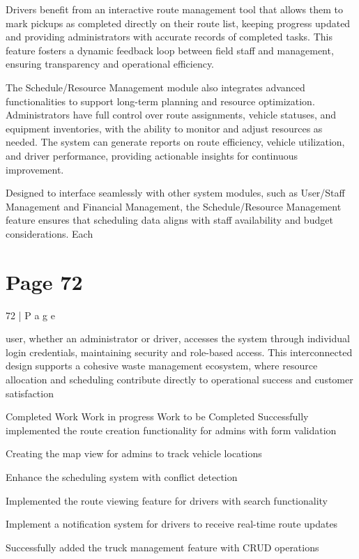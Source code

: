 \documentclass{article}
\begin{document}
Drivers benefit from an interactive route management tool that allows them to mark 
pickups as completed directly on their route list, keeping progress updated and providing 
administrators with accurate records of completed tasks. This feature fosters a dynamic 
feedback loop between field staff and management, ensuring transparency and 
operational efficiency. 
  
The Schedule/Resource Management module also integrates advanced functionalities to 
support long-term planning and resource optimization. Administrators have full control 
over route assignments, vehicle statuses, and equipment inventories, with the ability to 
monitor and adjust resources as needed. The system can generate reports on route 
efficiency, vehicle utilization, and driver performance, providing actionable insights for 
continuous improvement. 
  
Designed to interface seamlessly with other system modules, such as User/Staff 
Management and Financial Management, the Schedule/Resource Management feature 
ensures that scheduling data aligns with staff availability and budget considerations. Each 

\section*{Page 72}
72 | P a g e 
 
user, whether an administrator or driver, accesses the system through individual login 
credentials, maintaining security and role-based access. This interconnected design 
supports a cohesive waste management ecosystem, where resource allocation and 
scheduling contribute directly to operational success and customer satisfaction 
 
 
Completed Work Work in progress Work to be Completed 
Successfully implemented 
the route creation 
functionality for admins 
with form validation 
 
Creating the map view for 
admins to track vehicle 
locations 
 
Enhance the scheduling 
system with conflict 
detection 
 
Implemented the route 
viewing feature for drivers 
with search functionality 
 
 Implement a notification 
system for drivers to receive 
real-time route updates 
 
Successfully added the 
truck management feature 
with CRUD operations 
 
  
 
\end{document}
